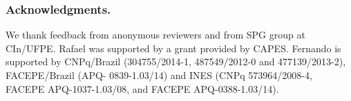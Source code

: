 \begin{sloppypar}
\subsubsection*{Acknowledgments.}
We thank feedback from anonymous reviewers and from SPG group at CIn/UFPE.
Rafael was supported by a grant provided by CAPES.
Fernando is supported by CNPq/Brazil (304755/2014-1, 487549/2012-0 and
477139/2013-2), FACEPE/Brazil (APQ- 0839-1.03/14) and INES (CNPq 573964/2008-4,
FACEPE APQ-1037-1.03/08, and FACEPE APQ-0388-1.03/14).
\end{sloppypar}

